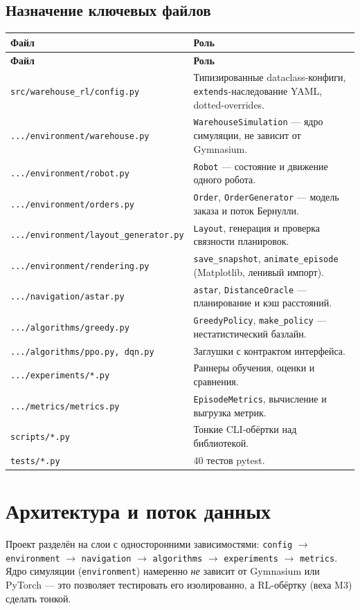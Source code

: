 \documentclass[11pt,a4paper]{article}
\newcommand{\code}[1]{\texttt{#1}}
\begin{document}
\subsection{Назначение ключевых файлов}
\begin{longtable}{@{}p{}p{}@{}}
\toprule
\textbf{Файл} & \textbf{Роль} \\
\midrule
\endfirsthead
\toprule
\textbf{Файл} & \textbf{Роль} \\
\midrule
\endhead
\code{src/warehouse\_rl/config.py} & Типизированные dataclass-конфиги,
\code{extends}-наследование YAML, dotted-overrides. \\
\code{.../environment/warehouse.py} & \code{WarehouseSimulation} — ядро
симуляции, не зависит от Gymnasium. \\
\code{.../environment/robot.py} & \code{Robot} — состояние и движение одного
робота. \\
\code{.../environment/orders.py} & \code{Order}, \code{OrderGenerator} —
модель заказа и поток Бернулли. \\
\code{.../environment/layout\_generator.py} & \code{Layout}, генерация и
проверка связности планировок. \\
\code{.../environment/rendering.py} & \code{save\_snapshot},
\code{animate\_episode} (Matplotlib, ленивый импорт). \\
\code{.../navigation/astar.py} & \code{astar}, \code{DistanceOracle} —
планирование и кэш расстояний. \\
\code{.../algorithms/greedy.py} & \code{GreedyPolicy}, \code{make\_policy} —
нестатистический базлайн. \\
\code{.../algorithms/ppo.py, dqn.py} & Заглушки с контрактом интерфейса. \\
\code{.../experiments/*.py} & Раннеры обучения, оценки и сравнения. \\
\code{.../metrics/metrics.py} & \code{EpisodeMetrics}, вычисление и выгрузка
метрик. \\
\code{scripts/*.py} & Тонкие CLI-обёртки над библиотекой. \\
\code{tests/*.py} & 40 тестов pytest. \\
\bottomrule
\end{longtable}

\section{Архитектура и поток данных}
Проект разделён на слои с односторонними зависимостями:
\code{config} $\rightarrow$ \code{environment} $\rightarrow$
\code{navigation} $\rightarrow$ \code{algorithms} $\rightarrow$
\code{experiments} $\rightarrow$ \code{metrics}. Ядро симуляции
(\code{environment}) намеренно \emph{не} зависит от Gymnasium или PyTorch — это
позволяет тестировать его изолированно, а RL-обёртку (веха M3) сделать тонкой.
\end{document}
